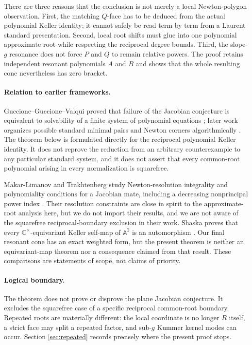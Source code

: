 \documentclass[11pt]{article}
\theoremstyle{definition}
\theoremstyle{remark}
\newcommand{\C}{\mathbb C}
\newcommand{\A}{\mathbb A}
\begin{document}
There are three reasons that the conclusion is not merely a local
Newton-polygon observation.  First, the matching \(Q\)-face has to be
deduced from the actual polynomial Keller identity; it cannot safely be
read term by term from a Laurent standard presentation.  Second, local
root shifts must glue into one polynomial approximate root while
respecting the reciprocal degree bounds.  Third, the slope-\(g\)
resonance does not force \(P\) and \(Q\) to remain relative powers.
The proof retains independent resonant polynomials \(A\) and \(B\) and
shows that the whole resulting cone nevertheless has zero bracket.

\paragraph{Relation to earlier frameworks.}
Guccione--Guccione--Valqui proved that failure of the Jacobian
conjecture is equivalent to solvability of a finite system of polynomial
equations \cite{GGVSystem}; later work organizes possible standard
minimal pairs and Newton corners algorithmically
\cite{GGVLowerSide,GGHVAlgorithms,GGHV2022}.  The theorem below is
formulated directly for the reciprocal polynomial Keller identity.
It does not reprove the reduction from an arbitrary counterexample to
any particular standard system, and it does not assert that every
common-root polynomial arising in every normalization is squarefree.

Makar-Limanov and Trakhtenberg study Newton-resolution integrality and
polynomiality conditions for a Jacobian mate, including a decreasing
nonprincipal power index \cite{MakarLimanovTrakhtenberg}.  Their
resolution constraints are close in spirit to the approximate-root
analysis here, but we do not import their results, and we are not aware
of the squarefree reciprocal-boundary exclusion in their work.
Shaska proves that every \(\C^\times\)-equivariant Keller self-map of
\(\A^2\) is an automorphism \cite{Shaska}.  Our final resonant cone has
an exact weighted form, but the present theorem is neither an
equivariant-map theorem nor a consequence claimed from that result.
These comparisons are statements of scope, not claims of priority.

\paragraph{Logical boundary.}
The theorem does not prove or disprove the plane Jacobian conjecture.
It excludes the squarefree case of a specific reciprocal common-root
boundary.  Repeated roots are materially different: the local
coordinate is no longer \(R\) itself, a strict face may split a repeated
factor, and sub-\(g\) Kummer kernel modes can occur.  Section
\ref{sec:repeated} records precisely where the present proof stops.
\end{document}
